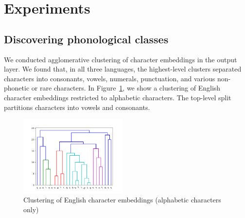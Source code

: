 

\section{Experiments}
\label{sec:experiments}


\subsection{Discovering phonological classes}

We conducted agglomerative clustering of character embeddings in the output layer.
We found that, in all three languages, the highest-level clusters separated characters into consonants, vowels, numerals, punctuation, and various non-phonetic or rare characters.
In Figure~\ref{fig:char-clustering}, we show a clustering of English character embeddings restricted to alphabetic characters.
The top-level split partitions characters into vowels and consonants.
%
%
%

\begin{figure}
\includegraphics[width=0.48\textwidth]{figures/char-emb-clustering-output_output-phonetic-wiki-english-nospaces-bptt-282506230.png}
\caption{Clustering of English character embeddings (alphabetic characters only)}\label{fig:char-clustering}
\end{figure}




